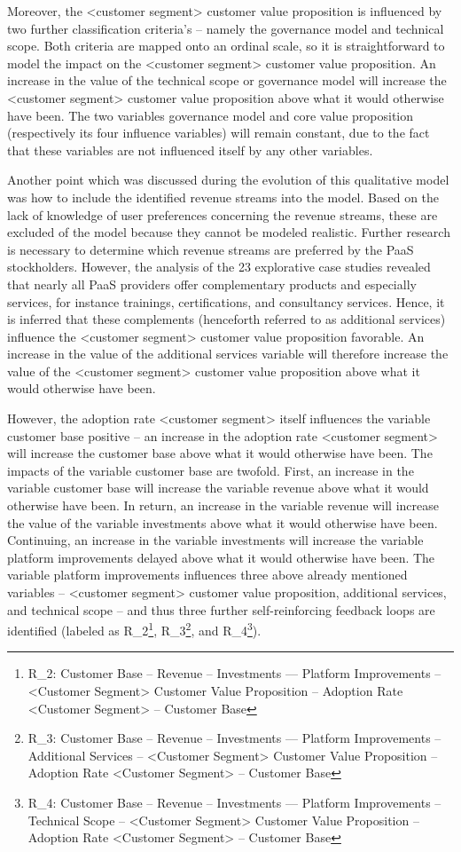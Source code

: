 Moreover, the <customer segment> customer value proposition is influenced by two further classification criteria's -- namely the governance model and technical scope. Both criteria are mapped onto an ordinal scale, so it is straightforward to model the impact on the <customer segment> customer value proposition. An increase in the value of the technical scope or governance model will increase the <customer segment> customer value proposition above what it would otherwise have been. The two variables governance model and core value proposition (respectively its four influence variables) will remain constant, due to the fact that these variables are not influenced itself by any other variables.

Another point which was discussed during the 	evolution of this qualitative model was how to include the identified revenue streams into the model. Based on the lack of knowledge of user preferences concerning the revenue streams, these are excluded of the model because they cannot be modeled realistic. Further research is necessary to determine which revenue streams are preferred by the \ac{PaaS} stockholders. However, the analysis of the 23 explorative case studies revealed that nearly all \ac{PaaS} providers offer complementary products and especially services, for instance trainings, certifications, and consultancy services. Hence, it is inferred that these complements (henceforth referred to as additional services) influence the <customer segment> customer value proposition favorable. An increase in the value of the additional services variable will therefore increase the value of the <customer segment> customer value proposition above what it would otherwise have been.

However, the adoption rate <customer segment> itself influences the variable customer base positive -- an increase in the adoption rate <customer segment> will increase the customer base above what it would otherwise have been. The impacts of the variable customer base are twofold. First, an increase in the variable customer base will increase the variable revenue above what it would otherwise have been. In return, an increase in the variable revenue will increase the value of the variable investments above what it would otherwise have been. Continuing, an increase in the variable investments will increase the variable platform improvements delayed above what it would otherwise have been. The variable platform improvements influences three above already mentioned variables -- <customer segment> customer value proposition, additional services, and technical scope -- and thus three further self-reinforcing feedback loops are identified (labeled as R\_2\footnote{R\_2: Customer Base -- Revenue -- Investments --- Platform Improvements -- <Customer Segment> Customer Value Proposition -- Adoption Rate <Customer Segment> -- Customer Base}, R\_3\footnote{R\_3: Customer Base -- Revenue -- Investments --- Platform Improvements -- Additional Services -- <Customer Segment> Customer Value Proposition -- Adoption Rate <Customer Segment> -- Customer Base}, and R\_4\footnote{R\_4: Customer Base -- Revenue -- Investments --- Platform Improvements -- Technical Scope -- <Customer Segment> Customer Value Proposition -- Adoption Rate <Customer Segment> -- Customer Base}).

